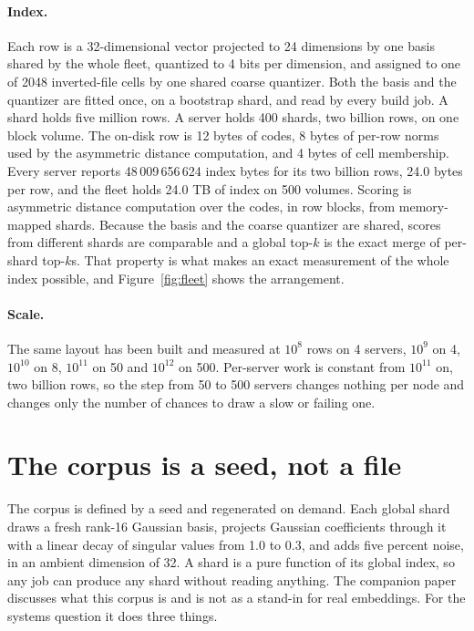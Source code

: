 \documentclass[sigconf, nonacm]{acmart}
\begin{document}
\paragraph{Index.} Each row is a 32-dimensional vector projected to 24 dimensions by one basis
shared by the whole fleet, quantized to 4 bits per dimension, and assigned to one of 2048
inverted-file cells by one shared coarse quantizer. Both the basis and the quantizer are fitted
once, on a bootstrap shard, and read by every build job. A shard holds five million rows. A
server holds 400 shards, two billion rows, on one block volume. The on-disk row is 12 bytes of
codes, 8 bytes of per-row norms used by the asymmetric distance computation, and 4 bytes of cell
membership. Every server reports 48\,009\,656\,624 index bytes for its two billion rows, 24.0
bytes per row, and the fleet holds 24.0 TB of index on 500 volumes. Scoring is asymmetric
distance computation over the codes, in row blocks, from memory-mapped shards. Because the basis
and the coarse quantizer are shared, scores from different shards are comparable and a global
top-$k$ is the exact merge of per-shard top-$k$s. That property is what makes an exact measurement
of the whole index possible, and Figure~\ref{fig:fleet} shows the arrangement.

\paragraph{Scale.} The same layout has been built and measured at $10^{8}$ rows on 4 servers,
$10^{9}$ on 4, $10^{10}$ on 8, $10^{11}$ on 50 and $10^{12}$ on 500. Per-server work is constant
from $10^{11}$ on, two billion rows, so the step from 50 to 500 servers changes nothing per node
and changes only the number of chances to draw a slow or failing one.

\section{The corpus is a seed, not a file}
\label{sec:corpus}

The corpus is defined by a seed and regenerated on demand. Each global shard draws a fresh
rank-16 Gaussian basis, projects Gaussian coefficients through it with a linear decay of singular
values from 1.0 to 0.3, and adds five percent noise, in an ambient dimension of 32. A shard is a
pure function of its global index, so any job can produce any shard without reading anything.
The companion paper \cite{bond2026recall} discusses what this corpus is and is not as a stand-in
for real embeddings. For the systems question it does three things.
\end{document}
